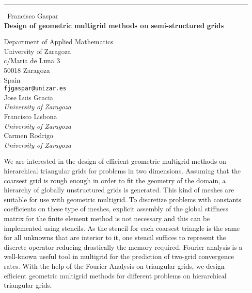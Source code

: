 \documentclass{report}
\begin{document}
\begin{center}
\rule{6in}{1pt} \
{\large Francisco Gaspar \\
{\bf Design of geometric multigrid methods on semi-structured grids}}

Department of Applied Mathematics \\ University of Zaragoza \\ c/Maria de Luna 3 \\ 50018 Zaragoza \\ Spain
\\
{\tt fjgaspar@unizar.es}\\
Jose Luis Gracia\\
{\em University of Zaragoza}\\
Francisco Lisbona\\
{\em University of Zaragoza}\\
Carmen Rodrigo\\
{\em University of Zaragoza}\end{center}

We are interested in the design of efficient geometric multigrid methods on hierarchical
triangular grids for problems in two dimensions. Assuming that the
coarsest grid is rough enough in order to fit the geometry of the domain, a hierarchy
of globally unstructured grids is generated. This kind of meshes are suitable
for use with geometric multigrid. To discretize problems with constants coefficients
on these type of meshes, explicit assembly of the global stiffness matrix for
the finite element method is not necessary and this can be implemented using
stencils. As the stencil for each coarsest triangle is the same for all unknowns
that are interior to it, one stencil suffices to represent the discrete operator reducing
drastically the memory required. Fourier analysis is a well-known useful
tool in multigrid for the prediction of two-grid convergence rates. With the
help of the Fourier Analysis on triangular grids, we design efficient geometric
multigrid methods for different problems on hierarchical triangular grids.
\end{document}
